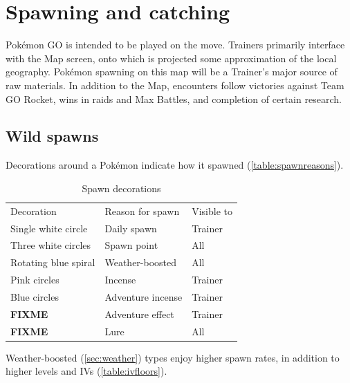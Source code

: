 \chapter{Spawning and catching}
\label{chap:spawn}
Pokémon GO is intended to be played on the move.
Trainers primarily interface with the Map screen, onto which is projected
  some approximation of the local geography.
Pokémon spawning on this map will be a Trainer's major source of raw materials.
In addition to the Map, encounters follow victories against Team GO Rocket,
  wins in raids and Max Battles, and completion of certain research.

\section{Wild spawns}
\label{sec:spawns}
Decorations around a Pokémon indicate how it spawned (\autoref{table:spawnreasons}).
\begin{table}[ht]
\centering
\begin{tabular}{lll}
  Decoration & Reason for spawn & Visible to\\
\Midrule
  Single white circle & Daily spawn & Trainer\\
  Three white circles & Spawn point & All\\
  Rotating blue spiral & Weather-boosted & All\\
  Pink circles & Incense & Trainer\\
  Blue circles & Adventure incense & Trainer\\
  \textbf{FIXME} & Adventure effect & Trainer\\
  \textbf{FIXME} & Lure & All\\
\end{tabular}
\caption{Spawn decorations}
\label{table:spawnreasons}
\end{table}
Weather-boosted (\autoref{sec:weather}) types enjoy higher spawn rates,
  in addition to higher levels and IVs (\autoref{table:ivfloors}).

